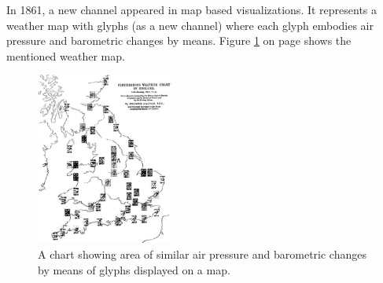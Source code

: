 In 1861, a new channel appeared in map based visualizations. It represents a weather map with glyphs (as a new channel) where each glyph embodies air pressure and barometric changes by means. Figure \ref{fig:weather-map} on page \pageref{fig:weather-map} shows the mentioned weather map.

\begin{figure}[!htb]
\centering
\includegraphics[width=0.4\textwidth,keepaspectratio]{images/history/weather.jpg}
\caption[
    A chart showing area of similar air pressure and barometric changes by means of glyphs displayed on a map., Urldate: 07.2016 \newline
\small\texttt{\url{http://datavis.ca/milestones//admin/uploads/images/galton-weather-charts2.gif}}
]{A chart showing area of similar air pressure and barometric changes by means of glyphs displayed on a map.}
\label{fig:weather-map}
\end{figure}

